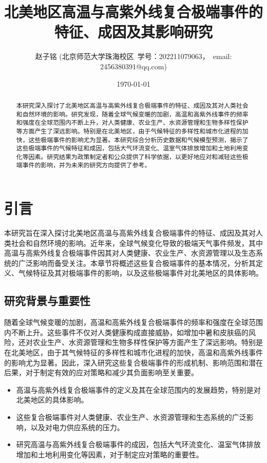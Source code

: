 \documentclass[12pt]{article}
\title{\fontsize{18pt}{27pt}\selectfont%
    {\heiti%
    北美地区高温与高紫外线复合极端事件的特征、成因及其影响研究}}%
\author{\fontsize{12pt}{18pt}\selectfont%
    {\fangsong%
       赵子铭}
    \fontsize{10.5pt}{15.75pt}\selectfont%
    {\fangsong%
        (北京师范大学珠海校区\ 学号：202211079063，\ email: 2456380391@qq.com)}}%
\date{\today}
\begin{document}
\maketitle


\begin{abstract}
本研究深入探讨了北美地区高温与高紫外线复合极端事件的特征、成因及其对人类社会和自然环境的影响。研究发现，随着全球气候变暖的加剧，高温和高紫外线事件的频率和强度在全球范围内不断上升，对人类健康、农业生产、水资源管理和生物多样性保护等方面产生了深远影响。特别是在北美地区，由于气候特征的多样性和城市化进程的加快，这些极端事件的影响尤为显著。本研究综合分析历史数据和气候模型预测，揭示了这些极端事件的气候特征和成因，包括大气环流变化、温室气体排放增加和土地利用变化等因素。研究结果为政策制定者和公众提供了科学依据，以更好地应对和减轻这些极端事件的影响，并为未来的研究方向提供了参考。
\end{abstract}


\newpage
\tableofcontents

\newpage
\section{引言}
本研究旨在深入探讨北美地区高温与高紫外线复合极端事件的特征、成因及其对人类社会和自然环境的影响。近年来，全球气候变化导致的极端天气事件频发，其中高温与高紫外线复合极端事件因其对人类健康、农业生产、水资源管理以及生态系统的广泛影响而备受关注。本章节将概述这些复合极端事件的基本情况，分析其定义、气候特征及其对极端事件的影响，以及这些极端事件对北美地区的具体影响。

\subsection{研究背景与重要性}
随着全球气候变暖的加剧，高温和高紫外线复合极端事件的频率和强度在全球范围内不断上升。这些事件不仅对人类健康构成直接威胁，如增加中暑和皮肤癌的风险，还对农业生产、水资源管理和生物多样性保护等方面产生了深远影响。特别是在北美地区，由于其气候特征的多样性和城市化进程的加快，高温和高紫外线事件的影响尤为显著。因此，深入研究这些复合极端事件的形成机制、影响范围和潜在后果，对于制定有效的应对策略和减少其负面影响至关重要。

\begin{itemize}
\item 高温与高紫外线复合极端事件的定义及其在全球范围内的发展趋势，特别是对北美地区的具体影响。
\item 这些复合极端事件对人类健康、农业生产、水资源管理和生态系统的广泛影响，以及对电力供应系统的压力。
\item 研究高温与高紫外线复合极端事件的成因，包括大气环流变化、温室气体排放增加和土地利用变化等因素，对于制定应对策略的重要性。
\end{itemize}
\end{document}
